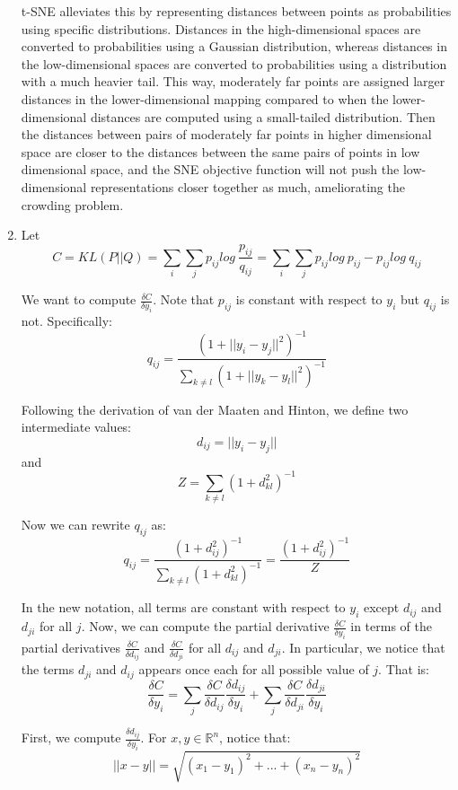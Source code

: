 \documentclass[a4paper]{article}
\begin{document}
\begin{enumerate}
{\newline
\newline
t-SNE alleviates this by representing distances between points as probabilities using specific distributions. Distances in the high-dimensional spaces are converted to probabilities using a Gaussian distribution, whereas distances in the low-dimensional spaces are converted to probabilities using a distribution with a much heavier tail. This way, moderately far points are assigned larger distances in the lower-dimensional mapping compared to when the lower-dimensional distances are computed using a small-tailed distribution. Then the distances between pairs of moderately far points in higher dimensional space are closer to the distances between the same pairs of points in low dimensional space, and the SNE objective function will not push the low-dimensional representations closer together as much, ameliorating the crowding problem. 


}
\item{ Let 
$$C = KL(P || Q) = \sum_i \sum_j p_{ij} log\ \frac{p_{ij}}{q_{ij}} = \sum_i \sum_j p_{ij} log\ p_{ij} - p_{ij} log\ q_{ij}$$

We want to compute $\frac{\delta C }{\delta y_i}$. Note that $p_{ij}$ is constant with respect to $y_i$ but $q_{ij}$ is not. Specifically:
$$q_{ij} = \frac{ (1+ ||y_i - y_j ||^2)^{-1} }{\sum_{k \neq l} (1 + ||y_k - y_l ||^2)^{-1} }$$ 

Following the derivation of van der Maaten and Hinton, we define two intermediate values:
$$d_{ij} = ||y_i - y_j || $$
and 
$$Z = \sum_{k \neq l} (1 + d_{kl}^2)^{-1} $$

Now we can rewrite $q_{ij}$ as:
$$q_{ij} = \frac{(1+d_{ij}^2)^{-1} }{ \sum_{k \neq l} (1 + d_{kl}^2)^{-1} } = \frac{(1+d_{ij}^2)^{-1} }{  Z }$$

In the new notation, all terms are constant with respect to $y_i$ except $d_{ij}$ and $d_{ji}$ for all $j$. Now, we can compute the partial derivative $\frac{\delta C }{\delta y_i}$ in terms of the partial derivatives $\frac{\delta C }{\delta d_{ij}}$ and $\frac{\delta C }{\delta d_{ji}}$ for all $d_{ij}$ and $d_{ji}$. 
In particular, we notice that the terms $d_{ji}$ and $d_{ij}$ appears once each for all possible value of $j$. That is:
$$\frac{\delta C }{\delta y_i} = \sum_j  \frac{\delta C }{\delta d_{ij}} \frac{\delta d_{ij} }{\delta y_{i}} + \sum_j  \frac{\delta C }{\delta d_{ji}} \frac{\delta d_{ji} }{\delta y_{i}} $$

First, we compute $\frac{\delta d_{ij} }{\delta y_{i}}$. For $x,y \in \mathbb{R}^n$, notice that:
$$ ||x - y || =  \sqrt{ (x_{1}-y_{1})^2 + ... + (x_{n}-y_{n})^2  } $$

}
\end{enumerate}
\end{document}
